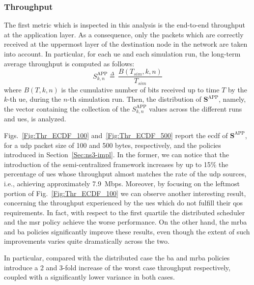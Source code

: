 \subsubsection{Throughput}
\label{subsec_thr}

The first metric which is inspected in this analysis is the end-to-end throughput at the application layer. As a consequence, only the packets which are correctly received at the uppermost layer of the destination node in the network are taken into account. In particular, for each \gls{ue} and each simulation run, the long-term average throughput is computed as follows:
\[ S^{\mathrm{APP}}_{k, n} \mathop = \limits^{\Delta} \, \frac{B(T_{sim}, k, n)}{T_{sim}} \]
where $B(T, k, n)$ is the cumulative number of bits received up to time $T$ by the $k$-th \gls{ue}, during the $n$-th simulation run. Then, the distribution of 
$\mathbf{S}^{\mathrm{APP}}$, namely, the vector containing the collection of the $S^{\mathrm{APP}}_{k, n}$ values across the different runs and \glspl{ue}, is analyzed.

Figs.~\ref{Fig:Thr_ECDF_100} and~\ref{Fig:Thr_ECDF_500} report the \gls{ecdf} of $\mathbf{S}^{\mathrm{APP}}$, for a \gls{udp} packet size of 100 and 500 bytes, respectively, and the policies introduced in Section~\ref{Sec:ns3-impl}. In the former, we can notice that the introduction of the semi-centralized framework increases by up to 15\% the percentage of \glspl{ue} whose throughput almost matches the rate of the \gls{udp} sources, i.e., achieving approximately 7.9~Mbps.
Moreover, by focusing on the leftmost portion of Fig.~\ref{Fig:Thr_ECDF_100} we can observe another interesting result, concerning the throughput experienced by the \glspl{ue} which do not fulfill their \gls{qos} requirements. In fact, with respect to the first quartile the distributed scheduler and the \gls{msr} policy achieve the worse performance.
On the other hand, the \gls{mrba} and \gls{ba} policies significantly improve these results, even though the extent of such improvements varies quite dramatically across the two.

In particular, compared with the distributed case the \gls{ba} and \gls{mrba} policies introduce a 2 and 3-fold increase of the worst case throughput respectively, coupled with a significantly lower variance in both cases. 


